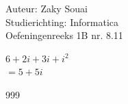 \documentclass[a4paper]{article}
\begin{document}
\noindent \large Auteur: Zaky Souai \\
\noindent \large Studierichting: Informatica\\
\noindent \large Oefeningenreeks 1B nr. 8.11\\

\medskip

\normalsize
	
	$ 6 + 2i + 3i + i^2 $ \\	
	
	$=  5 + 5i $ \\	
\begin{thebibliography}{999}
\end{thebibliography}
\end{document}

